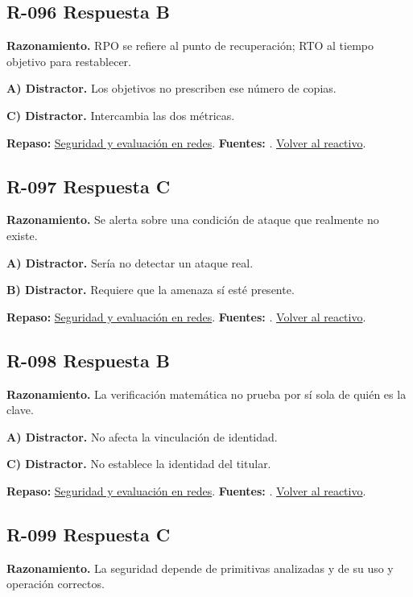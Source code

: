 \subsection*{R-096 \quad Respuesta B}\label{s:R-096}
\textbf{Razonamiento.} RPO se refiere al punto de recuperación; RTO al tiempo objetivo para restablecer.

\textbf{A) Distractor. }Los objetivos no prescriben ese número de copias.

\textbf{C) Distractor. }Intercambia las dos métricas.

\textbf{Repaso:} \hyperref[sec:r3]{Seguridad y evaluación en redes}. \textbf{Fuentes:} \cite{nistsecurity,owasp,aes,tls}. \hyperref[q:R-096]{Volver al reactivo}.\par\medskip

\subsection*{R-097 \quad Respuesta C}\label{s:R-097}
\textbf{Razonamiento.} Se alerta sobre una condición de ataque que realmente no existe.

\textbf{A) Distractor. }Sería no detectar un ataque real.

\textbf{B) Distractor. }Requiere que la amenaza sí esté presente.

\textbf{Repaso:} \hyperref[sec:r3]{Seguridad y evaluación en redes}. \textbf{Fuentes:} \cite{nistsecurity,owasp,aes,tls}. \hyperref[q:R-097]{Volver al reactivo}.\par\medskip

\subsection*{R-098 \quad Respuesta B}\label{s:R-098}
\textbf{Razonamiento.} La verificación matemática no prueba por sí sola de quién es la clave.

\textbf{A) Distractor. }No afecta la vinculación de identidad.

\textbf{C) Distractor. }No establece la identidad del titular.

\textbf{Repaso:} \hyperref[sec:r3]{Seguridad y evaluación en redes}. \textbf{Fuentes:} \cite{nistsecurity,owasp,aes,tls}. \hyperref[q:R-098]{Volver al reactivo}.\par\medskip

\subsection*{R-099 \quad Respuesta C}\label{s:R-099}
\textbf{Razonamiento.} La seguridad depende de primitivas analizadas y de su uso y operación correctos.

